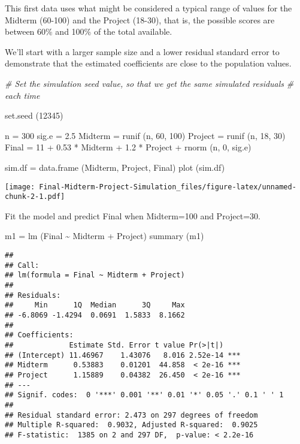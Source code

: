 \documentclass[
]{article}
\newenvironment{Shaded}{\begin{snugshade}}{\end{snugshade}}
\newcommand{\CommentTok}[1]{\textcolor[rgb]{0.56,0.35,0.01}{\textit{#1}}}
\newcommand{\DecValTok}[1]{\textcolor[rgb]{0.00,0.00,0.81}{#1}}
\newcommand{\FloatTok}[1]{\textcolor[rgb]{0.00,0.00,0.81}{#1}}
\newcommand{\FunctionTok}[1]{\textcolor[rgb]{0.00,0.00,0.00}{#1}}
\newcommand{\NormalTok}[1]{#1}
\newcommand{\OtherTok}[1]{\textcolor[rgb]{0.56,0.35,0.01}{#1}}
\newcommand{\SpecialCharTok}[1]{\textcolor[rgb]{0.00,0.00,0.00}{#1}}
\begin{document}
This first data uses what might be considered a typical range of values
for the Midterm (60-100) and the Project (18-30), that is, the possible
scores are between 60\% and 100\% of the total available.

We'll start with a larger sample size and a lower residual standard
error to demonstrate that the estimated coefficients are close to the
population values.

\begin{Shaded}
\begin{Highlighting}[]
\CommentTok{\# Set the simulation seed value, so that we get the same simulated residuals}
\CommentTok{\# each time}

\FunctionTok{set.seed}\NormalTok{ (}\DecValTok{12345}\NormalTok{)}

\NormalTok{n }\OtherTok{=} \DecValTok{300}
\NormalTok{sig.e }\OtherTok{=} \FloatTok{2.5}
\NormalTok{Midterm }\OtherTok{=} \FunctionTok{runif}\NormalTok{ (n, }\DecValTok{60}\NormalTok{, }\DecValTok{100}\NormalTok{)}
\NormalTok{Project }\OtherTok{=} \FunctionTok{runif}\NormalTok{ (n, }\DecValTok{18}\NormalTok{, }\DecValTok{30}\NormalTok{)}
\NormalTok{Final }\OtherTok{=} \DecValTok{11} \SpecialCharTok{+} \FloatTok{0.53} \SpecialCharTok{*}\NormalTok{ Midterm }\SpecialCharTok{+} \FloatTok{1.2} \SpecialCharTok{*}\NormalTok{ Project }\SpecialCharTok{+} \FunctionTok{rnorm}\NormalTok{ (n, }\DecValTok{0}\NormalTok{, sig.e)}

\NormalTok{sim.df }\OtherTok{=} \FunctionTok{data.frame}\NormalTok{ (Midterm, Project, Final)}
\FunctionTok{plot}\NormalTok{ (sim.df)}
\end{Highlighting}
\end{Shaded}

\texttt{[image: Final-Midterm-Project-Simulation\_files/figure-latex/unnamed-chunk-2-1.pdf]}

Fit the model and predict Final when Midterm=100 and Project=30.

\begin{Shaded}
\begin{Highlighting}[]
\NormalTok{m1 }\OtherTok{=} \FunctionTok{lm}\NormalTok{ (Final }\SpecialCharTok{\textasciitilde{}}\NormalTok{ Midterm }\SpecialCharTok{+}\NormalTok{ Project)}
\FunctionTok{summary}\NormalTok{ (m1)}
\end{Highlighting}
\end{Shaded}

\begin{verbatim}
## 
## Call:
## lm(formula = Final ~ Midterm + Project)
## 
## Residuals:
##     Min      1Q  Median      3Q     Max 
## -6.8069 -1.4294  0.0691  1.5833  8.1662 
## 
## Coefficients:
##             Estimate Std. Error t value Pr(>|t|)    
## (Intercept) 11.46967    1.43076   8.016 2.52e-14 ***
## Midterm      0.53883    0.01201  44.858  < 2e-16 ***
## Project      1.15889    0.04382  26.450  < 2e-16 ***
## ---
## Signif. codes:  0 '***' 0.001 '**' 0.01 '*' 0.05 '.' 0.1 ' ' 1
## 
## Residual standard error: 2.473 on 297 degrees of freedom
## Multiple R-squared:  0.9032, Adjusted R-squared:  0.9025 
## F-statistic:  1385 on 2 and 297 DF,  p-value: < 2.2e-16
\end{verbatim}
\end{document}

